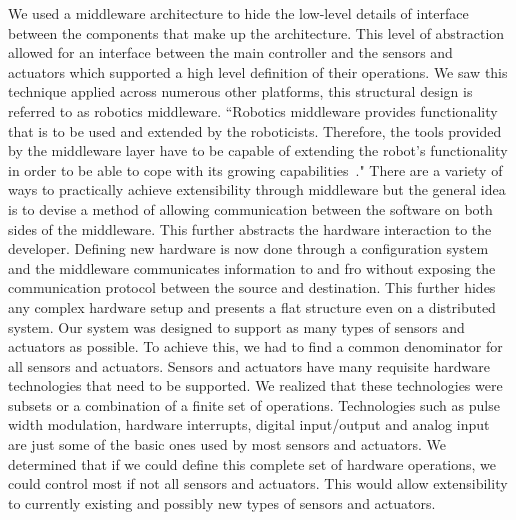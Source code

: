 We used a middleware architecture to hide the low-level details of interface between the components that make up the \xten architecture. This level of abstraction allowed for an interface between the main controller and the sensors and actuators which supported a high level definition of their operations. We saw this technique applied across numerous other platforms, this structural design is referred to as robotics middleware. ``Robotics middleware provides functionality that is to be used and extended by the roboticists. Therefore, the tools provided by the middleware layer have to be capable of extending the robot's functionality in order to be able to cope with its growing capabilities~\parencite{advanced}." There are a variety of ways to practically achieve extensibility through middleware but the general idea is to devise a method of allowing communication between the software on both sides of the middleware. This further abstracts the hardware interaction to the developer. Defining new hardware is now done through a configuration system and the middleware communicates information to and fro without exposing the communication protocol between the source and destination. This further hides any complex hardware setup and presents a flat structure even on a distributed system.
Our system was designed to support as many types of sensors and actuators as possible. To achieve this, we had to find a common denominator for all sensors and actuators. Sensors and actuators have many requisite hardware technologies that need to be supported. We realized that these technologies were subsets or a combination of a finite set of operations. Technologies such as pulse width modulation, hardware interrupts, digital input/output and analog input are just some of the basic ones used by most sensors and actuators. We determined that if we could define this complete set of hardware operations, we could control most if not all sensors and actuators. This would allow extensibility to currently existing and possibly new types of sensors and actuators.




